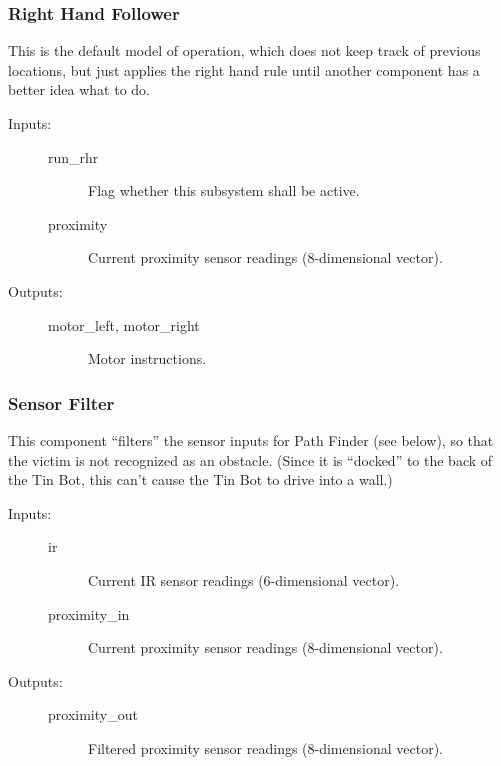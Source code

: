 \documentclass[a4paper,parskip,headheight=38pt]{scrartcl} %
\begin{document}
\subsubsection{Right Hand Follower}

This is the default model of operation,  which does not keep track of
previous locations, but just applies the right hand rule until another
component has a better idea what to do.

\begin{description}
\item[Inputs:] \hfill
	\begin{description}
	\item[run\_rhr] Flag whether this subsystem shall be active.
	\item[proximity] Current proximity sensor readings (8-dimensional vector).
	\end{description}
\item[Outputs:] \hfill
	\begin{description}
	\item[motor\_left, motor\_right] Motor instructions.
	\end{description}
\end{description}

\subsubsection{Sensor Filter}

This component \enquote{filters} the sensor inputs for Path Finder (see
below), so that the victim is not recognized as an obstacle.  (Since it
is \enquote{docked} to the back of the Tin Bot, this can't cause the
Tin Bot to drive into a wall.)

\begin{description}
\item[Inputs:] \hfill
	\begin{description}
	\item[ir] Current IR sensor readings (6-dimensional vector).
	\item[proximity\_in] Current proximity sensor readings (8-dimensional vector).
	\end{description}
\item[Outputs:] \hfill
	\begin{description}
	\item[proximity\_out] Filtered proximity sensor readings (8-dimensional vector).
	\end{description}
\end{description}
\end{document}
